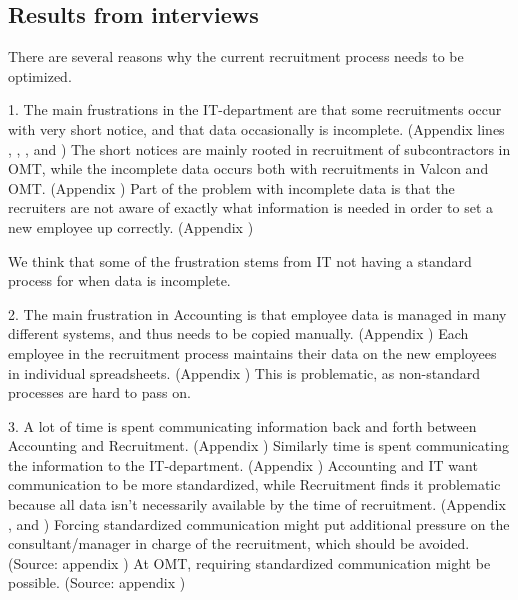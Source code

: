 \subsection{Results from interviews}
There are several reasons why the current recruitment process needs to be optimized.

1. The main frustrations in the IT-department are that some recruitments occur with very short notice, and that data occasionally is incomplete.
(Appendix  lines , , , and )
The short notices are mainly rooted in recruitment of subcontractors in OMT, while the incomplete data occurs both with recruitments in Valcon and OMT.
(Appendix )
Part of the problem with incomplete data is that the recruiters are not aware of exactly what information is needed in order to set a new employee up correctly.
(Appendix )

We think that some of the frustration stems from IT not having a standard process for when data is incomplete.

2. The main frustration in Accounting is that employee data is managed in many different systems, and thus needs to be copied manually.
(Appendix )
Each employee in the recruitment process maintains their data on the new employees in individual spreadsheets.
(Appendix )
This is problematic, as non-standard processes are hard to pass on.

3. A lot of time is spent communicating information back and forth between Accounting and Recruitment.
(Appendix )
Similarly time is spent communicating the information to the IT-department.
(Appendix )
Accounting and IT want communication to be more standardized, while Recruitment finds it problematic because all data isn't necessarily available by the time of recruitment.
(Appendix ,  and )
Forcing standardized communication might put additional pressure on the consultant/manager in charge of the recruitment, which should be avoided.
(Source: appendix )
At OMT, requiring standardized communication might be possible.
(Source: appendix )

